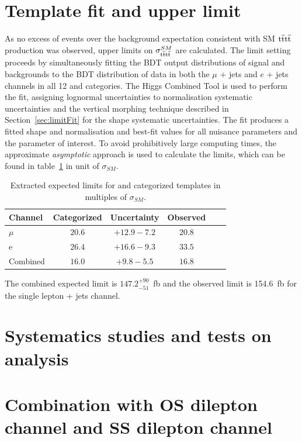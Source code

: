 \section{Template fit and upper limit}
\label{sec:limit13}
As no excess of events over the background expectation consistent with SM $\mathrm{t}\overline{\mathrm{t}}\mathrm{t}\overline{\mathrm{t}}$ production was observed, upper limits on $\sigma_{\mathrm{t}\overline{\mathrm{t}}\mathrm{t}\overline{\mathrm{t}}}^{SM}$ are calculated. 
The limit setting proceeds by simultaneously fitting the BDT output distributions of signal and backgrounds to the BDT distribution of data in both the $\mu$ + jets and $e$ + jets channels in all 12 \njets and \nMtags categories. The Higgs Combined Tool is used to perform the fit, assigning lognormal uncertainties to normalisation systematic uncertainties and the vertical morphing technique described in Section~\ref{sec:limitFit} for the shape systematic uncertainties. The fit produces a fitted shape and normalisation and best-fit values for all nuisance parameters and the parameter of interest. 
To avoid prohibitively large computing times, the approximate \emph{asymptotic} approach is used to calculate the \CLS limits, which can be found in table~\ref{tab:limits} in unit of $\sigma_{SM}$. 

\begin{table}[ht!]
\centering
\begin{tabular}{| l | c | c | c | c | c |}
  \hline
Channel  & Categorized & Uncertainty & Observed\\
 \hline
$\mu$  &$20.6$ & $+12.9 -7.2$ & $20.8$ \\
 \hline
e  &  $26.4$ & $+16.6 -9.3$ & $33.5$ \\
 \hline
 Combined  &  $16.0$ & $+9.8 -5.5$ & $16.8$ \\
 \hline
\end{tabular}
 \caption{Extracted expected limits for \njets and \nMtags categorized templates in multiples of $\sigma_{SM}$.}
  \label{tab:limits}
  \end{table}

The combined expected limit is $147.2^{+90}_{-51}$~fb and the observed limit is 154.6~fb for the single lepton + jets channel.

\section{Systematics studies and tests on analysis}

\section{Combination with OS dilepton channel and SS dilepton channel}

